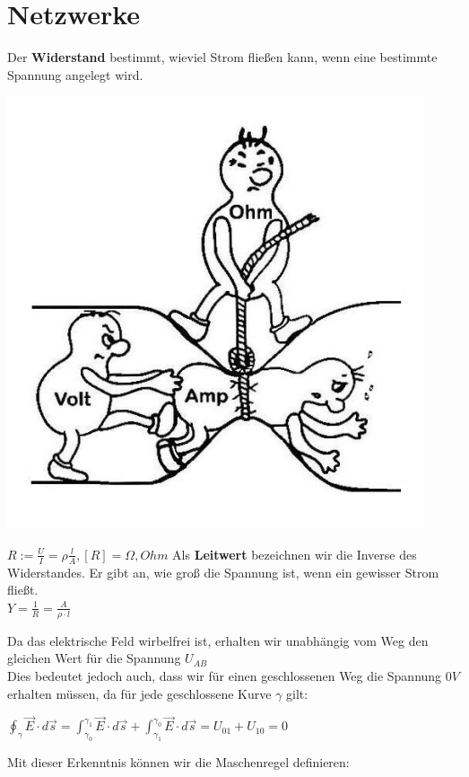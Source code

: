 					\section{Netzwerke}
					\label{chap:Style}



					\beginip
					Der \textbf{Widerstand} bestimmt, wieviel Strom fließen kann, wenn eine bestimmte Spannung angelegt wird. \\
					\begin{center}
						\includegraphics[scale=0.25]{img/widerstand.png}
					\end{center}
					\formulaBegin
					$ R :=  \frac{U}{I} =  \rho  \frac{l}{A},   {[R]} = \Omega, Ohm $
					\formulaEnd
					Als \textbf{Leitwert} bezeichnen wir die Inverse des Widerstandes. Er gibt an, wie groß die Spannung ist, wenn ein gewisser Strom fließt. \\
					\formulaBegin
					$ Y = \frac{1}{R} = \frac{A}{\rho \cdot l} $
					\formulaEnd
					\iend




										Da das elektrische Feld wirbelfrei ist, erhalten wir unabhängig vom Weg den gleichen Wert für die Spannung $ U_{AB} $ \\
										Dies bedeutet jedoch auch, dass wir für einen geschlossenen Weg die Spannung $0V$ erhalten müssen, da für jede geschlossene Kurve $\gamma$ gilt:
										\begin{center}
											\vspace{-2mm}

											$\displaystyle \oint_{\gamma} \vec{E} \cdot d\vec{s} = \int_{\gamma_0}^{\gamma_1} \vec{E} \cdot d\vec{s} + \int_{\gamma_1}^{\gamma_0} \vec{E} \cdot d\vec{s} = U_{01} + U_{10} = 0$
										\end{center}
										Mit dieser Erkenntnis können wir die Maschenregel definieren:

